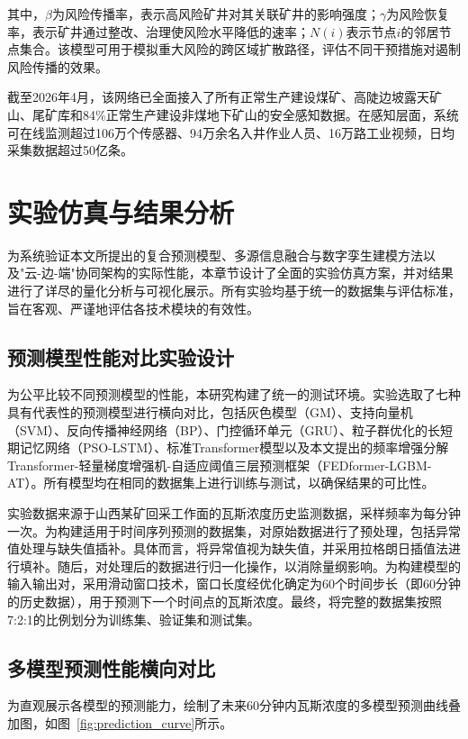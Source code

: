 \documentclass[twocolumn,a4paper]{ctexart}
\numberwithin{equation}{section}
\begin{document}
其中，$\beta$为风险传播率，表示高风险矿井对其关联矿井的影响强度；$\gamma$为风险恢复率，表示矿井通过整改、治理使风险水平降低的速率；$N(i)$表示节点$i$的邻居节点集合。该模型可用于模拟重大风险的跨区域扩散路径，评估不同干预措施对遏制风险传播的效果。

截至2026年4月，该网络已全面接入了所有正常生产建设煤矿、高陡边坡露天矿山、尾矿库和84\%正常生产建设非煤地下矿山的安全感知数据。在感知层面，系统可在线监测超过106万个传感器、94万余名入井作业人员、16万路工业视频，日均采集数据超过50亿条。

\section{实验仿真与结果分析}

为系统验证本文所提出的复合预测模型、多源信息融合与数字孪生建模方法以及"云-边-端"协同架构的实际性能，本章节设计了全面的实验仿真方案，并对结果进行了详尽的量化分析与可视化展示。所有实验均基于统一的数据集与评估标准，旨在客观、严谨地评估各技术模块的有效性。

\subsection{预测模型性能对比实验设计}

为公平比较不同预测模型的性能，本研究构建了统一的测试环境。实验选取了七种具有代表性的预测模型进行横向对比，包括灰色模型（GM）、支持向量机（SVM）、反向传播神经网络（BP）、门控循环单元（GRU）、粒子群优化的长短期记忆网络（PSO-LSTM）、标准Transformer模型以及本文提出的频率增强分解Transformer-轻量梯度增强机-自适应阈值三层预测框架（FEDformer-LGBM-AT）。所有模型均在相同的数据集上进行训练与测试，以确保结果的可比性。

实验数据来源于山西某矿回采工作面的瓦斯浓度历史监测数据，采样频率为每分钟一次。为构建适用于时间序列预测的数据集，对原始数据进行了预处理，包括异常值处理与缺失值插补。具体而言，将异常值视为缺失值，并采用拉格朗日插值法进行填补。随后，对处理后的数据进行归一化操作，以消除量纲影响。为构建模型的输入输出对，采用滑动窗口技术，窗口长度经优化确定为60个时间步长（即60分钟的历史数据），用于预测下一个时间点的瓦斯浓度。最终，将完整的数据集按照7:2:1的比例划分为训练集、验证集和测试集。

\subsection{多模型预测性能横向对比}

为直观展示各模型的预测能力，绘制了未来60分钟内瓦斯浓度的多模型预测曲线叠加图，如图~\ref{fig:prediction_curve}所示。
\end{document}
